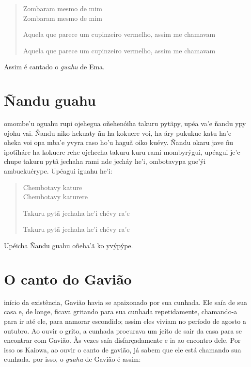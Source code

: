 \begin{verse}
Zombaram mesmo de mim\\
Zombaram mesmo de mim

Aquela que parece um cupinzeiro vermelho, \qb{}assim me chamavam

Aquela que parece um cupinzeiro vermelho, \qb{}assim me chamavam
\end{verse}

Assim é cantado o \textit{guahu} de Ema.

\chapter{Ñandu guahu}

 omombe'u oguahu rupi ojehegua oñehenóiha takuru pytãpy, upéa va'e
ñandu ypy ojohu vai. Ñandu niko hekuaty ñu ha kokuere voi, ha áry
pukukue katu ha'e oheka voi opa mba'e yvyra raso ho'u haguã oiko kuévy.
Ñandu okaru jave ñu ipotĩháre ha kokuere rehe ojehecha takuru kuru rami
mombyrýgui, upéagui je'e chupe takuru pytã jechaha rami nde jecháy he'i,
ombotavypa gue'ýi ambuekuérype. Upéagui iguahu he'i:

\begin{verse}
Chembotavy kature\\
Chembotavy katurere

Takuru pytã jechaha he'i chévy ra'e

Takuru pytã jechaha he'i chévy ra'e
\end{verse}



Upéicha Ñandu guahu oñeha'ã ko yvýpýpe.

\chapter{O canto do Gavião}

 início da existência, Gavião havia se apaixonado por sua cunhada. Ele
saía de sua casa e, de longe, ficava gritando para sua cunhada
repetidamente, chamando-a para ir até ele, para namorar escondido; assim
eles viviam no período de agosto a outubro. Ao ouvir o grito, a cunhada
procurava um jeito de sair da casa para se encontrar com Gavião. Às
vezes saía disfarçadamente e ia ao encontro dele. Por isso os Kaiowa, ao
ouvir o canto de gavião, já sabem que ele está chamando sua cunhada. por
isso, o \textit{guahu} de Gavião é assim:

